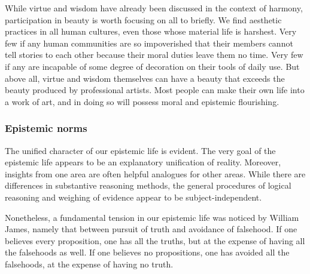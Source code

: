 While virtue and wisdom have already been discussed in the context of harmony, participation in beauty is worth focusing
on all to briefly. We find aesthetic practices in all human cultures, even those whose material life is harshest. Very 
few if any human communities are so impoverished that their members cannot tell stories to each other because their moral
duties leave them no time. Very few if any are incapable of some degree of decoration on their tools of daily use. But
above all, virtue and wisdom themselves can have a beauty that exceeds the beauty produced by professional artists.
Most people can make their own life into a work of art, and in doing so will possess moral and epistemic flourishing.

\subsubsection{Epistemic norms}
The unified character of our epistemic life is evident. The very goal of the epistemic life appears to be an explanatory unification of reality. Moreover, insights from one area are often helpful analogues for other areas. While there are differences in 
substantive reasoning methods, the general procedures of logical reasoning and weighing of evidence appear to be 
subject-independent.

Nonetheless, a fundamental tension in our epistemic life was noticed by William James, namely that between pursuit of truth and 
avoidance of falsehood. If one believes every proposition, one has all the truths, but at the expense of having 
all the falsehoods as well. If one believes no propositions, one has avoided all the falsehoods, at the expense of 
having no truth. 

